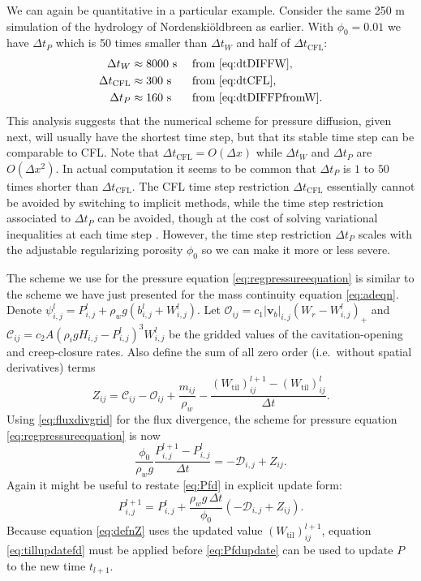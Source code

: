 \documentclass[gmd]{copernicus}   %
\newcommand{\text}{\textrm}
\newcommand\bv{\mathbf{v}}
\newcommand{\Wtil}{W_{\text{til}}}
\newcommand{\Wlij}{W^l_{i,j}}
\newcommand{\Plij}{P^l_{i,j}}
\newcommand{\Nbreen}{Nordenski\"oldbreen\xspace}
\begin{document}
We can again be quantitative in a particular example.  Consider the same 250 m simulation of the hydrology of \Nbreen as earlier.  With $\phi_0 = 0.01$ we have $\Delta t_P$ which is 50 times smaller than $\Delta t_W$ and half of $\Delta t_{\text{CFL}}$:
\begin{align*}
  \Delta t_W            &\approx 8000 \text{ s} &&\text{ from \eqref{eq:dtDIFFW}}, \\
  \Delta t_{\text{CFL}} &\approx 300  \text{ s} &&\text{ from \eqref{eq:dtCFL}}, \\
  \Delta t_P            &\approx 160  \text{ s} &&\text{ from \eqref{eq:dtDIFFPfromW}.}
\end{align*}
This analysis suggests that the numerical scheme for pressure diffusion, given next, will usually have the shortest time step, but that its stable time step can be comparable to CFL.  Note that $\Delta t_{\text{CFL}}=O(\Delta x)$ while $\Delta t_W$ and $\Delta t_P$ are $O(\Delta x^2)$.  In actual computation it seems to be common that $\Delta t_P$ is $1$ to $50$ times shorter than $\Delta t_{\text{CFL}}$.  The CFL time step restriction $\Delta t_{\text{CFL}}$ essentially cannot be avoided by switching to implicit methods, while the time step restriction associated to $\Delta t_P$ can be avoided, though at the cost of solving variational inequalities at each time step \citep{Schoofetal2012,Hewitt2013}.  However, the time step restriction $\Delta t_P$ scales with the adjustable regularizing porosity $\phi_0$ so we can make it more or less severe.

The scheme we use for the pressure equation \eqref{eq:regpressureequation} is similar to the scheme we have just presented for the mass continuity equation \eqref{eq:adeqn}.  Denote $\psi_{i,j}^l = P_{i,j}^l + \rho_w g (b_{i,j}^l + W_{i,j}^l)$.  Let $\mathcal{O}_{ij} = c_1 |\bv_b|_{i,j} \left(W_r - \Wlij\right)_+$ and $\mathcal{C}_{ij} = c_2 A \left(\rho_i g H_{i,j} - \Plij\right)^3 \Wlij$ be the gridded values of the cavitation-opening and creep-closure rates.  Also define the sum of all zero order (i.e.~without spatial derivatives) terms
\begin{equation}
Z_{ij} = \mathcal{C}_{ij} - \mathcal{O}_{ij} + \frac{m_{ij}}{\rho_w} - \frac{(\Wtil)_{ij}^{l+1} - (\Wtil)_{ij}^l}{\Delta t}.  \label{eq:defnZ}
\end{equation}
Using \eqref{eq:fluxdivgrid} for the flux divergence, the scheme for pressure equation \eqref{eq:regpressureequation} is now
\begin{equation}
\frac{\phi_0}{\rho_w g} \frac{P_{i,j}^{l+1} - \Plij}{\Delta t} = - \mathcal{D}_{i,j} + Z_{ij}.  \label{eq:Pfd}
\end{equation}
Again it might be useful to restate \eqref{eq:Pfd} in explicit update form:
\begin{equation}
P_{i,j}^{l+1} = \Plij + \frac{\rho_w g\,\Delta t}{\phi_0} \left(- \mathcal{D}_{i,j} + Z_{ij}\right). \label{eq:Pfdupdate}
\end{equation}
Because equation \eqref{eq:defnZ} uses the updated value $(\Wtil)_{ij}^{l+1}$, equation \eqref{eq:tillupdatefd} must be applied before \eqref{eq:Pfdupdate} can be used to update $P$ to the new time $t_{l+1}$.
\end{document}
